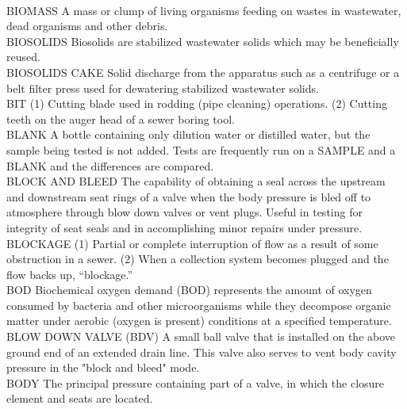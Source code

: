 \documentclass{article}
\begin{document}
\vspace{0.3cm}\\
BIOMASS
A mass or clump of living organisms feeding on wastes in wastewater, dead organisms and other debris. 
\vspace{0.3cm}\\
BIOSOLIDS
Biosolids are stabilized wastewater solids which may be beneficially reused.
\vspace{0.3cm}\\
BIOSOLIDS CAKE
Solid discharge from the apparatus such as a centrifuge or a belt filter press used for dewatering stabilized wastewater solids. 
\vspace{0.3cm}\\
BIT
(1) Cutting blade used in rodding (pipe cleaning) operations. (2) Cutting teeth on the auger head of a sewer boring tool. 
\vspace{0.3cm}\\
BLANK
A bottle containing only dilution water or distilled water, but the sample being tested is not added. Tests are frequently run on a SAMPLE and a BLANK and the differences are compared.
\vspace{0.3cm}\\
BLOCK AND BLEED
The capability of obtaining a seal across the upstream and downstream seat rings of a valve when the body pressure is bled off to atmosphere through blow down valves or vent plugs. Useful in testing for integrity of seat seals and in accomplishing minor repairs under pressure.
\vspace{0.3cm}\\
BLOCKAGE
(1) Partial or complete interruption of flow as a result of some obstruction in a sewer. (2) When a collection system becomes plugged and the flow backs up, “blockage.” 
\vspace{0.3cm}\\
BOD
Biochemical oxygen demand (BOD) represents the amount of oxygen consumed by bacteria and other microorganisms while they decompose organic matter under aerobic (oxygen is present) conditions at a specified temperature.
\vspace{0.3cm}\\
BLOW DOWN VALVE (BDV)
A small ball valve that is installed on the above ground end of an extended drain line. This valve also serves to vent body cavity pressure in the "block and bleed" mode.
\vspace{0.3cm}\\
BODY
The principal pressure containing part of a valve, in which the closure element and seats are located.
\end{document}
